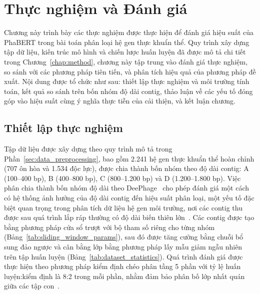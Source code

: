 \chapter{Thực nghiệm và Đánh giá}
\label{chap:thuc_nghiem_danh_gia}

Chương này trình bày các thực nghiệm được thực hiện để đánh giá hiệu suất của PhaBERT trong bài toán phân loại hệ gen thực khuẩn thể. Quy trình xây dựng tập dữ liệu, kiến trúc mô hình và chiến lược huấn luyện đã được mô tả chi tiết trong Chương~\ref{chap:method}, chương này tập trung vào đánh giá thực nghiệm, so sánh với các phương pháp tiên tiến, và phân tích hiệu quả của phương pháp đề xuất. Nội dung được tổ chức như sau: thiết lập thực nghiệm và môi trường tính toán, kết quả so sánh trên bốn nhóm độ dài contig, thảo luận về các yếu tố đóng góp vào hiệu suất cùng ý nghĩa thực tiễn của cải thiện, và kết luận chương.

\section{Thiết lập thực nghiệm}
\label{sec:thiet_lap_thuc_nghiem}

Tập dữ liệu được xây dựng theo quy trình mô tả trong Phần~\ref{sec:data_preprocessing}, bao gồm 2.241 hệ gen thực khuẩn thể hoàn chỉnh (707 ôn hòa và 1.534 độc lực), được chia thành bốn nhóm theo độ dài contig: A (100--400 bp), B (400--800 bp), C (800--1.200 bp) và D (1.200--1.800 bp). Việc phân chia thành bốn nhóm độ dài theo DeePhage~\cite{wu2021deephage} cho phép đánh giá một cách có hệ thống ảnh hưởng của độ dài contig đến hiệu suất phân loại, một yếu tố đặc biệt quan trọng trong phân tích dữ liệu hệ gen môi trường, nơi các contig thu được sau quá trình lắp ráp thường có độ dài biến thiên lớn~\cite{ghurye2016metagenomic}. Các contig được tạo bằng phương pháp cửa sổ trượt với bộ tham số riêng cho từng nhóm (Bảng~\ref{tab:sliding_window_params}), sau đó được tăng cường bằng chuỗi bổ sung đảo ngược và cân bằng lớp bằng phương pháp lấy mẫu giảm ngẫu nhiên trên tập huấn luyện (Bảng~\ref{tab:dataset_statistics}). Quá trình đánh giá được thực hiện theo phương pháp kiểm định chéo phân tầng 5 phần với tỷ lệ huấn luyện:kiểm định là 8:2 trong mỗi phần, nhằm đảm bảo phân bố lớp nhất quán giữa các tập con~\cite{wu2021deephage}.

